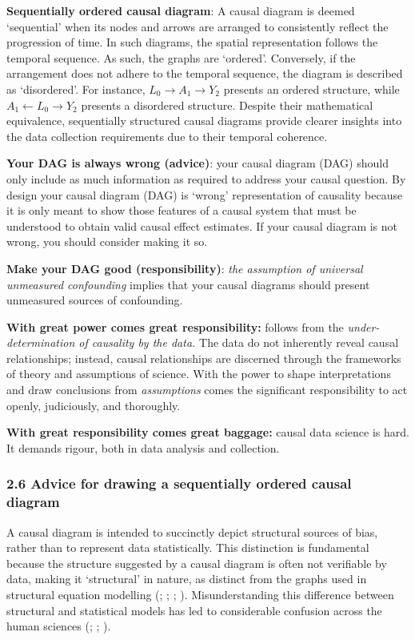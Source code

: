 \documentclass[
  singlecolumn]{article}
\begin{document}
\textbf{Sequentially ordered causal diagram}: A causal diagram is deemed
`sequential' when its nodes and arrows are arranged to consistently
reflect the progression of time. In such diagrams, the spatial
representation follows the temporal sequence. As such, the graphs are
`ordered'. Conversely, if the arrangement does not adhere to the
temporal sequence, the diagram is described as `disordered'. For
instance, \(L_0 \to A_1 \to Y_2\) presents an ordered structure, while
\(A_1 \leftarrow L_0 \to Y_2\) presents a disordered structure. Despite
their mathematical equivalence, sequentially structured causal diagrams
provide clearer insights into the data collection requirements due to
their temporal coherence.

\textbf{Your DAG is always wrong (advice)}: your causal diagram (DAG)
should only include as much information as required to address your
causal question. By design your causal diagram (DAG) is `wrong'
representation of causality because it is only meant to show those
features of a causal system that must be understood to obtain valid
causal effect estimates. If your causal diagram is not wrong, you should
consider making it so.

\textbf{Make your DAG good (responsibility)}: \emph{the assumption of
universal unmeasured confounding} implies that your causal diagrams
should present unmeasured sources of confounding.

\textbf{With great power comes great responsibility:} follows from the
\emph{under-determination of causality by the data.} The data do not
inherently reveal causal relationships; instead, causal relationships
are discerned through the frameworks of theory and assumptions of
science. With the power to shape interpretations and draw conclusions
from \emph{assumptions} comes the significant responsibility to act
openly, judiciously, and thoroughly.

\textbf{With great responsibility comes great baggage:} causal data
science is hard. It demands rigour, both in data analysis and
collection.

\subsubsection{2.6 Advice for drawing a sequentially ordered causal
diagram}\label{advice-for-drawing-a-sequentially-ordered-causal-diagram}

A causal diagram is intended to succinctly depict structural sources of
bias, rather than to represent data statistically. This distinction is
fundamental because the structure suggested by a causal diagram is often
not verifiable by data, making it `structural' in nature, as distinct
from the graphs used in structural equation modelling
(;
;
;
). Misunderstanding this
difference between structural and statistical models has led to
considerable confusion across the human sciences
(;
;
).
\end{document}
